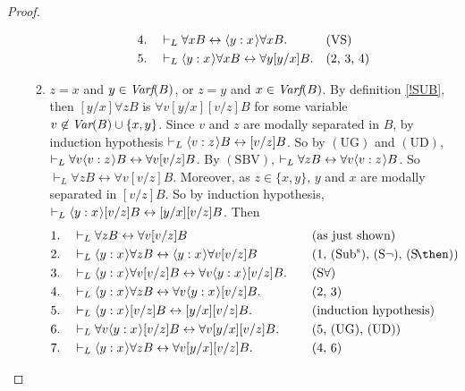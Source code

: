 \documentclass[11pt]{woarticle}
\theoremstyle{break}
\theoremstyle{nonumberplain}
\newcommand{\1}{\;\,|\;\,}
\newcommand{\var}{\emph{Var}}
\newcommand{\fvar}{\emph{Varf}}
\renewcommand{\t}[1]{\ensuremath{\langle #1  \makebox[.2ex]{}\rangle}}
\newcommand{\T}[1]{\ensuremath{(\mathrm{ #1})}}
\begin{document}
\begin{proof}
\begin{enumerate}
\begin{enumerate}
\begin{alignat*}{2}
        4.\quad& \vdash_L \forall x B \leftrightarrow \t{y:x}\forall x B.
               &&\text{\T{VS}}\\
        5.\quad& \vdash_L \t{y:x}\forall x B \leftrightarrow \forall y[y/x]B.
               &&\text{(2, 3, 4)}
      \end{alignat*}
    \item $z=x$ and $y\in \fvar(B)$, or $z=y$ and $x\in \fvar(B)$.\;
      By definition \ref{!SUB}, then $[y/x]\forall zB$ is $\forall v
      [y/x][v/z]B$ for some variable $v \not\in \var(B) \cup
      \{x,y\}$. Since $v$ and $z$ are modally separated in $B$, by
      induction hypothesis $\vdash_{L} \t{v:z}B \leftrightarrow
      [v/z]B$. So by \T{UG} and \T{UD}, $\vdash_{L} \forall v\t{v:z}B
      \leftrightarrow \forall v[v/z]B$. By \T{SBV}, $\vdash_{L} \forall
      z B \leftrightarrow \forall v\t{v:z}B$. So $\vdash_{L} \forall z
      B \leftrightarrow \forall v[v/z]B$.  Moreover, as $z \in
      \{x,y\}$, $y$ and $x$ are modally separated in $[v/z]B$. So by
      induction hypothesis, $\vdash_{L} \t{y:x}[v/z]B \leftrightarrow
      [y/x][v/z]B$. Then
      \begin{alignat*}{2}
      1.\quad& \vdash_{L} \forall z B \leftrightarrow \forall v [v/z]B 
         &\quad& \text{(as just shown)}\\
      2.\quad& \vdash_{L} \t{y:x}\forall z B \leftrightarrow \t{y:x}\forall v [v/z]B
         && \text{(1, \T{Sub^s}, \T{S\neg}, \T{S\!\then})}\\
      3.\quad& \vdash_{L} \t{y:x}\forall v [v/z]B \leftrightarrow \forall v\t{y:x}[v/z]B.
         && \text{\T{S\forall}}\\
      4.\quad& \vdash_{L} \t{y:x}\forall z B \leftrightarrow \forall v\t{y:x}[v/z]B.
         && \text{(2, 3)}\\
      5.\quad& \vdash_{L} \t{y:x}[v/z]B \leftrightarrow [y/x][v/z]B.
         && \text{(induction hypothesis)}\\
      6.\quad& \vdash_{L} \forall v\t{y:x}[v/z]B \leftrightarrow \forall v [y/x][v/z]B.
         && \text{(5, \T{UG}, \T{UD})}\\
      7.\quad& \vdash_{L} \t{y:x}\forall z B \leftrightarrow \forall v [y/x][v/z]B.
         && \text{(4, 6)}
      \end{alignat*}
    \end{enumerate}


\end{enumerate}
\end{proof}
\end{document}

